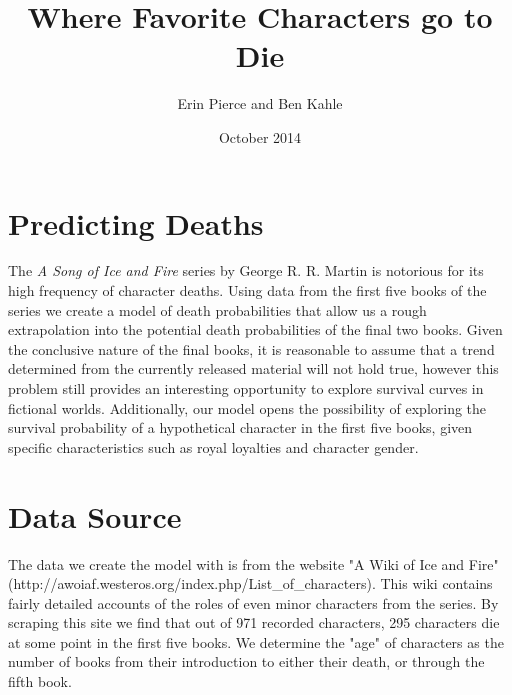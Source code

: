 \documentclass{article}
\title{Where Favorite Characters go to Die}
\author{Erin Pierce and Ben Kahle}
\date{October 2014}
\begin{document}
\maketitle

\section{Predicting Deaths}
The \textit{A Song of Ice and Fire} series by George R. R. Martin is notorious for its high frequency of character deaths. Using data from the first five books of the series we create a model of death probabilities that allow us a rough extrapolation into the potential death probabilities of the final two books. Given the conclusive nature of the final books, it is reasonable to assume that a trend determined from the currently released material will not hold true, however this problem still provides an interesting opportunity to explore survival curves in fictional worlds. Additionally, our model opens the possibility of exploring the survival probability of a hypothetical character in the first five books, given specific characteristics such as royal loyalties and character gender.

\section{Data Source}
The data we create the model with is from the website "A Wiki of Ice and Fire" (http://awoiaf.westeros.org/index.php/List\_of\_characters). This wiki contains fairly detailed accounts of the roles of even minor characters from the series. By scraping this site we find that out of 971 recorded characters, 295 characters die at some point in the first five books. We determine the "age" of characters as the number of books from their introduction to either their death, or through the fifth book.
\end{document}
